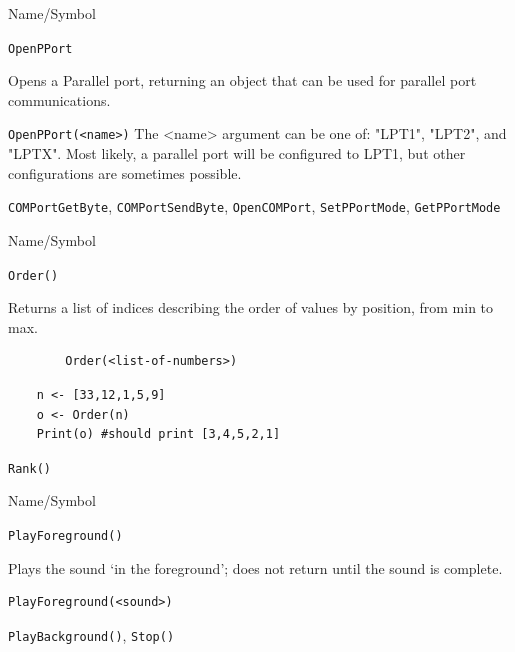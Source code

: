 \begin{desc}{Name/Symbol}
\item[Name/Symbol] \verb+OpenPPort+ 

\item[Description]  
  Opens a Parallel  port, returning an object that can be used for parallel port communications.
\item[Usage]       
     \verb+OpenPPort(<name>)+ 
 The <name> argument can be one of: "LPT1", "LPT2", and "LPTX".  Most likely, a parallel port will be configured to 
LPT1, but other configurations are sometimes possible. 
\item[Example]

\item[See Also]
\verb+COMPortGetByte+, \verb+COMPortSendByte+, \verb+OpenCOMPort+, \verb+SetPPortMode+, \verb+GetPPortMode+ 
\end{desc} 





\begin{desc}{Name/Symbol}
\item[Name/Symbol]	\verb+Order()+

\item[Description]	Returns a list of indices describing the order of values by position, from min to max. 

\item[Usage]
\begin{verbatim}
		Order(<list-of-numbers>)
\end{verbatim}

\item[Example]	
\begin{verbatim}
	n <- [33,12,1,5,9]
  	o <- Order(n)
    Print(o) #should print [3,4,5,2,1]
\end{verbatim}

\item[See Also]	\verb+Rank()+
\end{desc}

\vfill
\newpage
{}
\vfill


\begin{desc}{Name/Symbol}
\item[Name/Symbol]	\verb+PlayForeground()+  

\item[Description]	Plays the sound `in the foreground'; 
		does not return until the sound is complete.

\item[Usage]		
\begin{verbatim}
PlayForeground(<sound>)
\end{verbatim}

\item[Example]	

\item[See Also]	\verb+PlayBackground()+, \verb+Stop()+
\end{desc}

